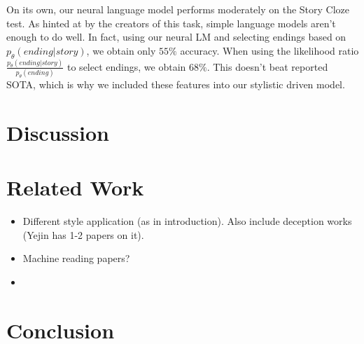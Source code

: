 \documentclass[11pt,a4paper]{article}
\newcommand{\isection}[2]{\section{#1}\label{ssec:#2}}
\newcommand{\isectionb}[1]{\section{#1}\label{ssec:#1}}
\newcommand{\ms}[1]{{\color{cyan}\{\textit{#1}\}$_{ms}$}}
\newcommand{\roy}[1]{\footnote{\color{red}{\textbf{Roy: #1}}}}
\renewcommand{\ms}[1]{}
\renewcommand{\roy}[1]{}
\begin{document}
On its own, our neural language model performs moderately on the Story Cloze test. As hinted at by the creators of this task, simple language models aren't enough to do well. In fact, using our neural LM and selecting endings based on $p_\theta(ending|story)$, we obtain only $55\%$ accuracy. When using the likelihood ratio $\frac{p_\theta(ending|story)}{p_\theta(ending)}$ to select endings, we obtain $68\%$. This doesn't beat reported SOTA, which is why we included these features into our stylistic driven model.


\isectionb{Discussion}



\isection{Related Work}{Related}

\begin{itemize}
\item Different style application (as in introduction). Also include deception works (Yejin has 1-2 papers on it). 
\item Machine reading papers? 
\item \ms{Pennebaker's work on function words? they link function words to psychological aspects}
\end{itemize}


\isectionb{Conclusion}




%
%

\newpage


\end{document}

